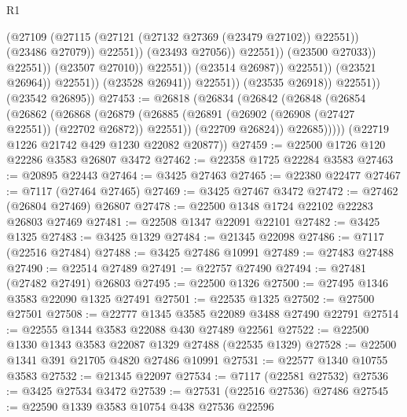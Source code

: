 \begin{lexlean}{R1}
\begin{coremodule}
                                                    (@27109
                                                      (@27115
                                                        (@27121
                                                          (@27132 @27369 (@23479 @27102))
                                                          @22551))
                                                      (@23486 @27079))
                                                    @22551))
                                                (@23493 @27056))
                                              @22551))
                                          (@23500 @27033))
                                        @22551))
                                    (@23507 @27010))
                                  @22551))
                              (@23514 @26987))
                            @22551))
                        (@23521 @26964))
                      @22551))
                  (@23528 @26941))
                @22551))
            (@23535 @26918))
          @22551))
      (@23542 @26895))
@27453 := @26818
    (@26834
      (@26842
        (@26848
          (@26854
            (@26862
              (@26868
                (@26879
                  (@26885 (@26891 (@26902 (@26908 (@27427 @22551)) (@22702 @26872)) @22551))
                  (@22709 @26824))
                @22685)))))
      (@22719 @1226 @21742 @429 @1230 @22082 @20877))
@27459 := @22500 @1726 @120 @22286 @3583 @26807 @3472
@27462 := @22358 @1725 @22284 @3583
@27463 := @20895 @22443
@27464 := @3425 @27463
@27465 := @22380 @22477
@27467 := @7117 (@27464 @27465)
@27469 := @3425 @27467 @3472
@27472 := @27462 (@26804 @27469) @26807
@27478 := @22500 @1348 @1724 @22102 @22283 @26803 @27469
@27481 := @22508 @1347 @22091 @22101
@27482 := @3425 @1325
@27483 := @3425 @1329
@27484 := @21345 @22098
@27486 := @7117 (@22516 @27484)
@27488 := @3425 @27486 @10991
@27489 := @27483 @27488
@27490 := @22514 @27489
@27491 := @22757 @27490
@27494 := @27481 (@27482 @27491) @26803
@27495 := @22500 @1326
@27500 := @27495 @1346 @3583 @22090 @1325 @27491
@27501 := @22535 @1325
@27502 := @27500 @27501
@27508 := @22777 @1345 @3585 @22089 @3488 @27490 @22791
@27514 := @22555 @1344 @3583 @22088 @430 @27489 @22561
@27522 := @22500 @1330 @1343 @3583 @22087 @1329 @27488 (@22535 @1329)
@27528 := @22500 @1341 @391 @21705 @4820 @27486 @10991
@27531 := @22577 @1340 @10755 @3583
@27532 := @21345 @22097
@27534 := @7117 (@22581 @27532)
@27536 := @3425 @27534 @3472
@27539 := @27531 (@22516 @27536) @27486
@27545 := @22590 @1339 @3583 @10754 @438 @27536 @22596

\end{coremodule}
\end{lexlean}
